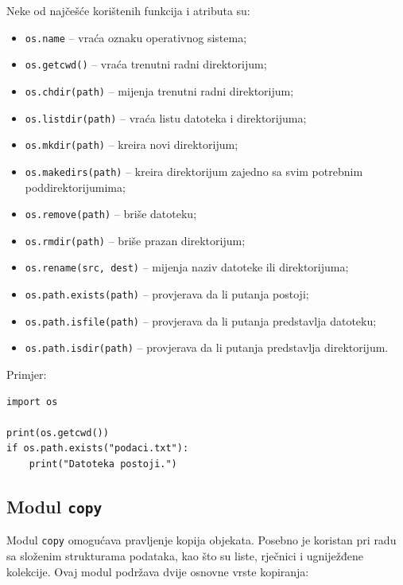 Neke od najčešće korištenih funkcija i atributa su:

\begin{itemize}
	\item \texttt{os.name} -- vraća oznaku operativnog sistema;
	\item \texttt{os.getcwd()} -- vraća trenutni radni direktorijum;
	
	\item \texttt{os.chdir(path)} -- mijenja trenutni radni direktorijum;
	
	\item \texttt{os.listdir(path)} -- vraća listu datoteka i direktorijuma;
	
	\item \texttt{os.mkdir(path)} -- kreira novi direktorijum;
	\item \texttt{os.makedirs(path)} -- kreira direktorijum zajedno sa svim potrebnim poddirektorijumima;
	
	\item \texttt{os.remove(path)} -- briše datoteku;
	
	\item \texttt{os.rmdir(path)} -- briše prazan direktorijum;
	
	\item \texttt{os.rename(src, dest)} -- mijenja naziv datoteke ili direktorijuma;
	
	\item \texttt{os.path.exists(path)} -- provjerava da li putanja postoji;
	
	\item \texttt{os.path.isfile(path)} -- provjerava da li putanja predstavlja datoteku;
	
	\item \texttt{os.path.isdir(path)} -- provjerava da li putanja predstavlja direktorijum.
	
\end{itemize}

Primjer:

\begin{verbatim}
import os

print(os.getcwd())
if os.path.exists("podaci.txt"):
    print("Datoteka postoji.")
\end{verbatim}

\subsection{Modul \texttt{copy}}

Modul \texttt{copy} omogućava pravljenje kopija objekata. Posebno je koristan pri radu sa složenim strukturama podataka, kao što su liste, rječnici i ugniježđene kolekcije. Ovaj modul podržava dvije osnovne vrste kopiranja:

